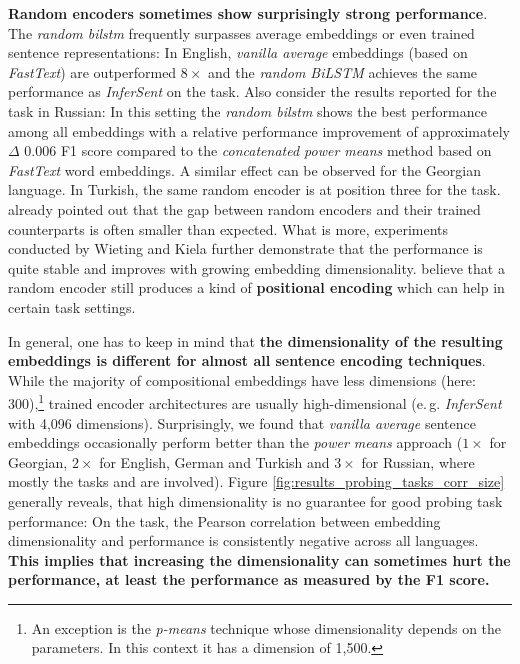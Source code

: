  \textbf{Random encoders sometimes show surprisingly strong performance}. The \textit{random \gls{bilstm}} frequently surpasses average embeddings or even trained sentence representations: In English, \textit{vanilla average} embeddings (based on \textit{FastText}) are outperformed $8\times$ and the \textit{random BiLSTM} achieves the same performance as \textit{InferSent} on the  task. Also consider the results reported for the  task in Russian: In this setting the \textit{random \gls{bilstm}} shows the best performance among all embeddings with a relative performance improvement of approximately $\Delta$ 0.006 F1 score compared to the \textit{concatenated power means} method based on \textit{FastText} word embeddings. A similar effect can be observed for the Georgian language. In Turkish, the same random encoder is at position three for the  task. \citep{Wieting.2019} already pointed out that the gap between random encoders and their trained counterparts is often smaller than expected. What is more, experiments conducted by Wieting and Kiela further demonstrate that the performance is quite stable and improves with growing embedding dimensionality. \citep{Conneau.2018a} believe that a random encoder still produces a kind of \textbf{positional encoding} which can help in certain task settings.

 In general, one has to keep in mind that \textbf{the dimensionality of the resulting embeddings is different for almost all sentence encoding techniques}. While the majority of compositional embeddings have less dimensions (here: 300),\footnote{An exception is the \textit{p-means} technique whose dimensionality depends on the parameters. In this context it has a dimension of 1,500.} trained encoder architectures are usually high-dimensional (e.\,g. \textit{InferSent} with 4,096 dimensions). Surprisingly, we found that \textit{vanilla average} sentence embeddings occasionally perform better than the \textit{power means} approach ($1\times$ for Georgian, $2\times$ for English, German and Turkish and $3\times$ for Russian, where mostly the tasks  and  are involved). Figure \vref{fig:results_probing_tasks_corr_size} generally reveals, that high dimensionality is no guarantee for good probing task performance: On the  task, the Pearson correlation between embedding dimensionality and performance is consistently negative across all languages. \textbf{This implies that increasing the dimensionality can sometimes hurt the performance, at least the performance as measured by the F1 score.}

